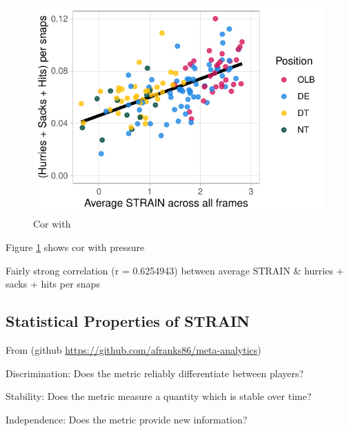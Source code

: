 \documentclass{statsoc}
\begin{document}
\begin{figure}

{\centering \includegraphics{paper_files/figure-latex/fig_cor_pressure-1} 

}

\caption{Cor with}\label{fig:fig_cor_pressure}
\end{figure}

Figure \ref{fig:fig_cor_pressure} shows cor with pressure

Fairly strong correlation (r = 0.6254943) between average STRAIN \&
hurries + sacks + hits per snaps

\hypertarget{statistical-properties-of-strain}{%
\subsection{Statistical Properties of
STRAIN}\label{statistical-properties-of-strain}}

From \citet{Franks2016Meta} (github
\url{https://github.com/afranks86/meta-analytics})

Discrimination: Does the metric reliably differentiate between players?

Stability: Does the metric measure a quantity which is stable over time?

Independence: Does the metric provide new information?
\end{document}
